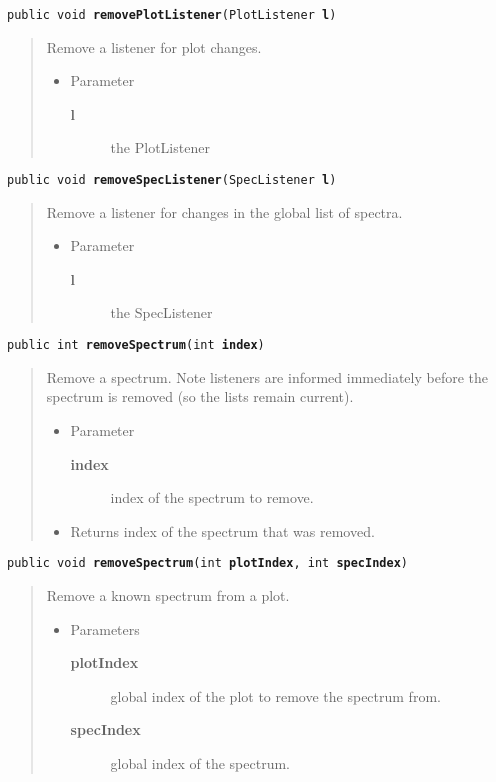 \documentclass[twoside,11pt,nolof]{starlink}
\providecommand{\method}[1]{\texttt{#1}}
\newenvironment{desc}{\begin{quote}}{\end{quote}}
\begin{document}
\method{public void \textbf{removePlotListener}(\texttt{PlotListener} \textbf{l})\label{l307}\label{l308}}
\begin{desc}Remove a listener for plot changes.
\begin{itemize}
\item{Parameter
  \begin{description}
   \item[\textbf{l}]{the PlotListener}
  \end{description}}
\end{itemize}
\end{desc}

\method{public void \textbf{removeSpecListener}(\texttt{SpecListener} \textbf{l})\label{l309}\label{l310}}
\begin{desc}Remove a listener for changes in the global list of spectra.
\begin{itemize}
\item{Parameter
  \begin{description}
   \item[\textbf{l}]{the SpecListener}
  \end{description}}
\end{itemize}
\end{desc}

\method{public int \textbf{removeSpectrum}(\texttt{int} \textbf{index})\label{l311}\label{l312}}
\begin{desc}Remove a spectrum. Note listeners are informed immediately
  before the spectrum is removed (so the lists remain current).
\begin{itemize}
\item{Parameter
  \begin{description}
   \item[\textbf{index}]{index of the spectrum to remove.}
  \end{description}}
\end{itemize}
\begin{itemize}
\item{Returns index of the spectrum that was removed. }
\end{itemize}
\end{desc}

\method{public void \textbf{removeSpectrum}(\texttt{int} \textbf{plotIndex}, \texttt{int} \textbf{specIndex})\label{l313}\label{l314}}
\begin{desc}Remove a known spectrum from a plot.
\begin{itemize}
\item{Parameters
  \begin{description}
   \item[\textbf{plotIndex}]{global index of the plot to remove the
                   spectrum from.}
   \item[\textbf{specIndex}]{global index of the spectrum.}
  \end{description}}
\end{itemize}
\end{desc}
\end{document}
